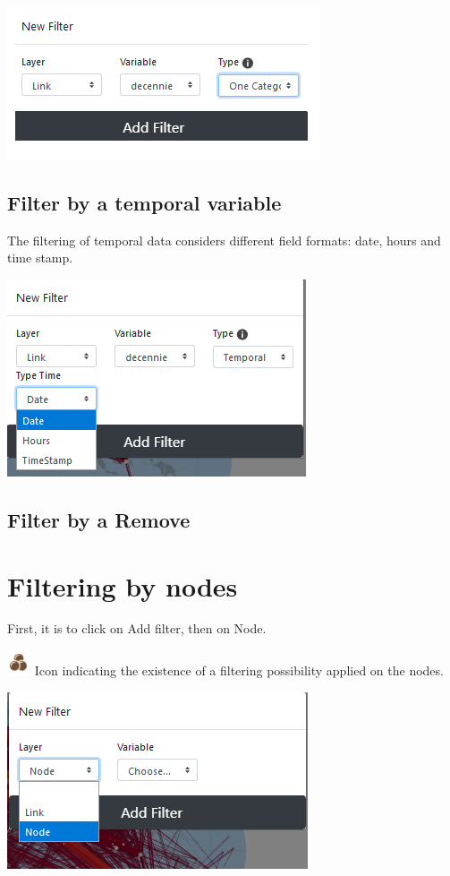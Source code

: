 \documentclass[
  letterpaper,
  DIV=11,
  numbers=noendperiod]{scrreprt}
\begin{document}
\includegraphics{images/Add_filter_links_category.png}

\subsection{Filter by a temporal
variable}\label{filter-by-a-temporal-variable}

The filtering of temporal data considers different field formats: date,
hours and time stamp.

\includegraphics{images/Add_filter_links_temporal.png}

\subsection{Filter by a Remove}\label{filter-by-a-remove}

\section{Filtering by nodes}\label{filtering-by-nodes}

First, it is to click on Add filter, then on Node.

\includegraphics{images/icon_nodes_filtering.png} Icon indicating the
existence of a filtering possibility applied on the nodes.

\includegraphics{images/Add_filter_nodes1.png}
\end{document}
